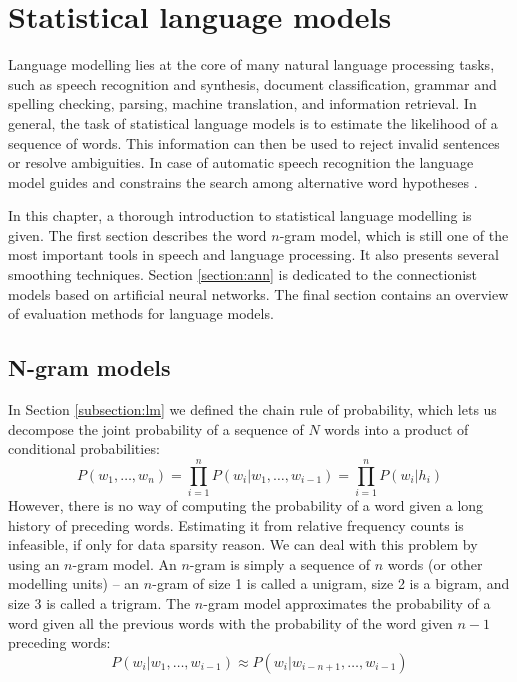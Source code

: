 \chapter{Statistical language models}
\label{chapter:lm}
Language modelling lies at the core of many natural language processing tasks, such as speech recognition and synthesis, document classification, grammar and spelling checking, parsing, machine translation, and information retrieval. In general, the task of statistical language models is to estimate the likelihood of a sequence of words. This information can then be used to reject invalid sentences or resolve ambiguities. In case of automatic speech recognition the language model guides and constrains the search among alternative word hypotheses \cite{glass2013automatic}.

In this chapter, a thorough introduction to statistical language modelling is given. The first section describes the word $n$-gram model, which is still one of the most important tools in speech and language processing. It also presents several smoothing techniques. Section \ref{section:ann} is dedicated to the connectionist models based on artificial neural networks. The final section contains an overview of evaluation methods for language models.
\section{N-gram models}
\label{section:ngrams}
In Section \ref{subsection:lm} we defined the chain rule of probability, which lets us decompose the joint probability of a sequence of $N$ words into a product of conditional probabilities:
\begin{equation}
	P(w_{1}, \dots, w_{n})=\prod_{i=1}^{n}P(w_{i}|w_{1},\dots,w_{i-1})=\prod_{i=1}^{n}P(w_{i}|h_{i})
\end{equation}
However, there is no way of computing the probability of a word given a long history of preceding words. Estimating it from relative frequency counts is infeasible, if only for data sparsity reason. We can deal with this problem by using an $n$-gram model. An $n$-gram is simply a sequence of $n$ words (or other modelling units) -- an $n$-gram of size 1 is called a unigram, size 2 is a bigram, and size 3 is called a trigram. The $n$-gram model approximates the probability of a word given all the previous words with the probability of the word given $n-1$ preceding words:
\begin{equation}
	P(w_{i}|w_{1},\dots,w_{i-1})\approx P(w_{i}|w_{i-n+1},\dots,w_{i-1})
\end{equation}

